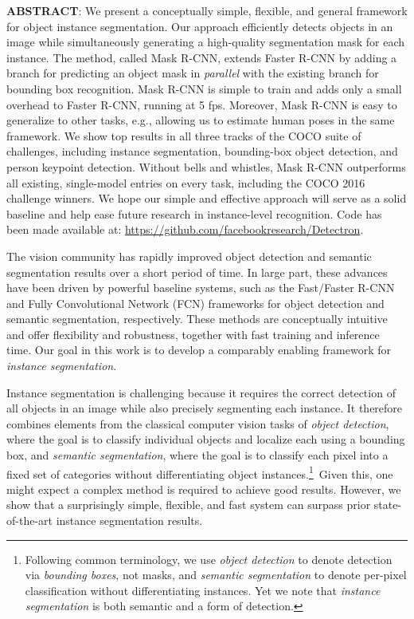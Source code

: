 \textbf{ABSTRACT}: We present a conceptually simple, flexible, and general framework for object instance segmentation. Our approach efficiently detects objects in an image while simultaneously generating a high-quality segmentation mask for each instance. The method, called Mask R-CNN, extends Faster R-CNN by adding a branch for predicting an object mask in \emph{parallel} with the existing branch for bounding box recognition. Mask R-CNN is simple to train and adds only a small overhead to Faster R-CNN, running at 5 fps. Moreover, Mask R-CNN is easy to generalize to other tasks, e.g., allowing us to estimate human poses in the same framework. We show top results in all three tracks of the COCO suite of challenges, including instance segmentation, bounding-box object detection, and person keypoint detection. Without bells and whistles, Mask R-CNN outperforms all existing, single-model entries on every task, including the COCO 2016 challenge winners. We hope our simple and effective approach will serve as a solid baseline and help ease future research in instance-level recognition. Code has been made available at: \url{https://github.com/facebookresearch/Detectron}.


The vision community has rapidly improved object detection and semantic segmentation results over a short period of time. In large part, these advances have been driven by powerful baseline systems, such as the Fast/Faster R-CNN and Fully Convolutional Network (FCN) frameworks for object detection and semantic segmentation, respectively. These methods are conceptually intuitive and offer flexibility and robustness, together with fast training and inference time. Our goal in this work is to develop a comparably enabling framework for \emph{instance segmentation}.

Instance segmentation is challenging because it requires the correct detection of all objects in an image while also precisely segmenting each instance. It therefore combines elements from the classical computer vision tasks of \emph{object detection}, where the goal is to classify individual objects and localize each using a bounding box, and \emph{semantic segmentation}, where the goal is to classify each pixel into a fixed set of categories without differentiating object instances.\footnote{Following common terminology, we use \emph{object detection} to denote detection via \emph{bounding boxes}, not masks, and \emph{semantic segmentation} to denote per-pixel classification without differentiating instances. Yet we note that \emph{instance segmentation} is both semantic and a form of detection.}~Given this, one might expect a complex method is required to achieve good results. However, we show that a surprisingly simple, flexible, and fast system can surpass prior state-of-the-art instance segmentation results.

